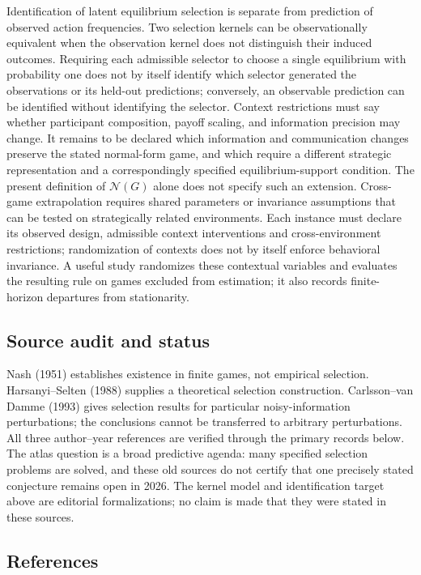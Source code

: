 \documentclass[11pt,a4paper]{article}
\begin{document}
Identification of latent equilibrium selection is separate from prediction of observed action frequencies. Two selection kernels can be observationally equivalent when the observation kernel does not distinguish their induced outcomes. Requiring each admissible selector to choose a single equilibrium with probability one does not by itself identify which selector generated the observations or its held-out predictions; conversely, an observable prediction can be identified without identifying the selector. Context restrictions must say whether participant composition, payoff scaling, and information precision may change. It remains to be declared which information and communication changes preserve the stated normal-form game, and which require a different strategic representation and a correspondingly specified equilibrium-support condition. The present definition of $\mathcal N(G)$ alone does not specify such an extension. Cross-game extrapolation requires shared parameters or invariance assumptions that can be tested on strategically related environments. Each instance must declare its observed design, admissible context interventions and cross-environment restrictions; randomization of contexts does not by itself enforce behavioral invariance. A useful study randomizes these contextual variables and evaluates the resulting rule on games excluded from estimation; it also records finite-horizon departures from stationarity.

\subsection*{Source audit and status}

Nash (1951) establishes existence in finite games, not empirical selection. Harsanyi--Selten (1988) supplies a theoretical selection construction. Carlsson--van Damme (1993) gives selection results for particular noisy-information perturbations; the conclusions cannot be transferred to arbitrary perturbations. All three author--year references are verified through the primary records below. The atlas question is a broad predictive agenda: many specified selection problems are solved, and these old sources do not certify that one precisely stated conjecture remains open in 2026. The kernel model and identification target above are editorial formalizations; no claim is made that they were stated in these sources.

\subsection*{References}
\end{document}
